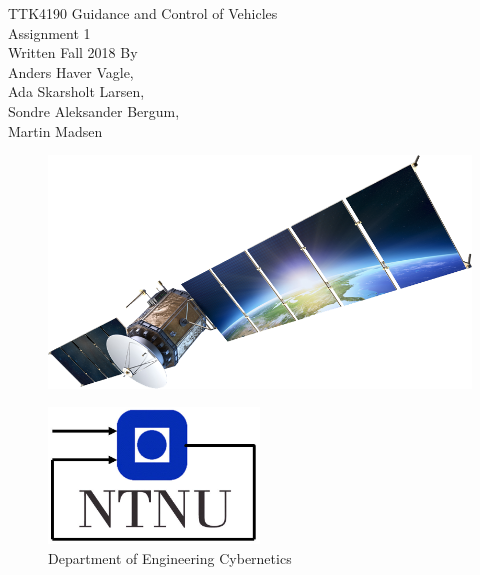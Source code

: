\documentclass[a4paper]{article}
\begin{document}

\begin{titlepage}
\begin{center}
\Large TTK4190 Guidance and Control of Vehicles \\
\vspace{10pt}
\Large  Assignment 1 \\
\vspace{10pt}
\large Written Fall 2018 By \\
\large Anders Haver Vagle,\\ Ada Skarsholt Larsen,\\ Sondre Aleksander Bergum,\\ Martin Madsen
\begin{figure}[h]
\centering
\includegraphics[width=\textwidth]{Satellite-PNG-Clipart.png}\\
\end{figure}

\begin{figure}[b]
\centering
\includegraphics[width=0.5\textwidth]{itk_ntnu}\\
Department of Engineering Cybernetics
\end{figure}
\end{center}
\end{titlepage}
\end{document}
